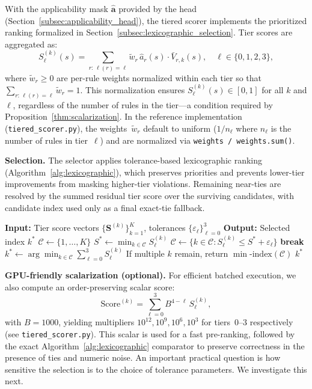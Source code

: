 With the applicability mask $\hat{\mathbf{a}}$ provided by the head (Section~\ref{subsec:applicability_head}), the tiered scorer implements the prioritized ranking formalized in Section~\ref{subsec:lexicographic_selection}.  Tier scores are aggregated as:
\begin{equation}
\label{eq:tier_score_full}
S_\ell^{(k)}(s)=\sum_{r:\,\ell(r)=\ell}\tilde{w}_r\,\hat{a}_r(s)\cdot \bar{V}_{r,k}(s), \quad \ell\in\{0,1,2,3\},
\end{equation}
where $\tilde{w}_r \geq 0$ are per-rule weights normalized within each tier so that $\sum_{r:\,\ell(r)=\ell}\tilde{w}_r = 1$.  This normalization ensures $S_\ell^{(k)}(s)\in[0,1]$ for all $k$ and $\ell$, regardless of the number of rules in the tier---a condition required by Proposition~\ref{thm:scalarization}.  In the reference implementation (\texttt{tiered\_scorer.py}), the weights~$\tilde{w}_r$ default to uniform ($1/n_\ell$ where $n_\ell$ is the number of rules in tier~$\ell$) and are normalized via \texttt{weights / weights.sum()}.

\textbf{Selection.}
The selector applies tolerance-based lexicographic ranking (Algorithm~\ref{alg:lexicographic}), which preserves priorities and prevents lower-tier improvements from masking higher-tier violations. Remaining near-ties are resolved by the summed residual tier score over the surviving candidates, with candidate index used only as a final exact-tie fallback.

\begin{algorithm}[h]
\caption{Lexicographic Trajectory Selection with Tolerance}
\label{alg:lexicographic}
\begin{algorithmic}[1]
\State \textbf{Input:} Tier score vectors $\{\mathbf{S}^{(k)}\}_{k=1}^{K}$, tolerances $\{\varepsilon_\ell\}_{\ell=0}^{3}$
\State \textbf{Output:} Selected index $k^*$
\State $\mathcal{C}\leftarrow\{1,\ldots,K\}$ 
    \State $S^* \leftarrow \min_{k\in\mathcal{C}} S_\ell^{(k)}$
    \State $\mathcal{C}\leftarrow\{k\in\mathcal{C}: S_\ell^{(k)} \le S^*+\varepsilon_\ell\}$
     \State \textbf{break} \EndIf
\EndFor
\State $k^*\leftarrow \arg\min_{k\in\mathcal{C}}\sum_{\ell=0}^{3} S_\ell^{(k)}$ 
\State If multiple $k$ remain, return $\min\text{-index}(\mathcal{C})$
\State \Return $k^*$
\end{algorithmic}
\end{algorithm}

\textbf{GPU-friendly scalarization (optional).}
For efficient batched execution, we also compute an order-preserving scalar score:
\begin{equation}
\text{Score}^{(k)}=\sum_{\ell=0}^{3} B^{4-\ell}\,S_\ell^{(k)},
\end{equation}
with $B{=}1000$, yielding multipliers $10^{12},10^{9},10^{6},10^{3}$ for tiers~0--3 respectively (see \texttt{tiered\_scorer.py}). This scalar is used for a fast pre-ranking, followed by the exact Algorithm~\ref{alg:lexicographic} comparator to preserve correctness in the presence of ties and numeric noise. An important practical question is how sensitive the selection is to the
choice of tolerance parameters. We investigate this next.

